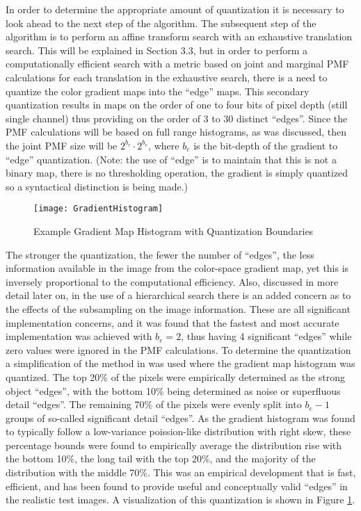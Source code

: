 In order to determine the appropriate amount of quantization it is necessary to look ahead to the next step of the algorithm. The subsequent step of the algorithm is to perform an affine transform search with an exhaustive translation search. This will be explained in Section 3.3, but in order to perform a computationally efficient search with a metric based on joint and marginal PMF calculations for each translation in the exhaustive search, there is a need to quantize the color gradient maps into the ``edge'' maps. This secondary quantization results in maps on the order of one to four bits of pixel depth (still single channel) thus providing on the order of 3 to 30 distinct ``edges''. Since the PMF calculations will be based on full range histograms, as was discussed, then the joint PMF size will be $2^{b_{e}}\cdot2^{b_{e}}$, where $b_{e}$ is the bit-depth of the gradient to ``edge'' quantization. (Note: the use of ``edge'' is to maintain that this is not a binary map, there is no thresholding operation, the gradient is simply quantized so a syntactical distinction is being made.)

\begin{figure}[h]
\centering
\texttt{[image: GradientHistogram]}
\caption{Example Gradient Map Histogram with Quantization Boundaries}
\label{gradienthistogram}
\end{figure}

The stronger the quantization, \ie{ }the fewer the number of ``edges'', the less information available in the image from the color-space gradient map, yet this is inversely proportional to the computational efficiency. Also, discussed in more detail later on, in the use of a hierarchical search there is an added concern as to the effects of the subsampling on the image information. These are all significant implementation concerns, and it was found that the fastest and most accurate implementation was achieved with $b_{e}=2$, thus having 4 significant ``edges'' while zero values were ignored in the PMF calculations. To determine the quantization a simplification of the method in \cite{Ugarriza2009} was used where the gradient map histogram was quantized. The top 20\% of the pixels were empirically determined as the strong object ``edges'', with the bottom 10\% being determined as noise or superfluous detail ``edges''. The remaining 70\% of the pixels were evenly split into $b_{e}-1$ groups of so-called significant detail ``edges''. As the gradient histogram was found to typically follow a low-variance poission-like distribution with right skew, these percentage bounds were found to empirically average the distribution rise with the bottom 10\%, the long tail with the top 20\%, and the majority of the distribution with the middle 70\%. This was an empirical development that is fast, efficient, and has been found to provide useful and conceptually valid ``edges'' in the realistic test images. A visualization of this quantization is shown in Figure \ref{gradienthistogram}.



